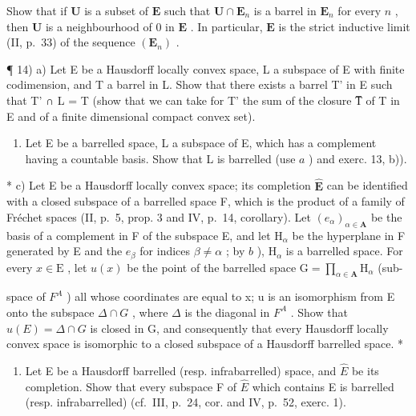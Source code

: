 Show that if \(\mathbf{U}\) is a subset of \(\mathbf{E}\) such that \(\mathbf{U} \cap \mathbf{E}_n\) is a barrel in \(\mathbf{E}_n\) for every \(n\) , then \(\mathbf{U}\) is a neighbourhood of 0 in \(\mathbf{E}\) . In particular, \(\mathbf{E}\) is the strict inductive limit (II, p.~33) of the sequence \((\mathbf{E}_n)\) .

¶ 14) a) Let E be a Hausdorff locally convex space, L a subspace of E with finite codimension, and T a barrel in L. Show that there exists a barrel T' in E such that T' ∩ L = T (show that we can take for T' the sum of the closure T̅ of T in E and of a finite dimensional compact convex set).

\begin{enumerate}
\def\labelenumi{\alph{enumi})}
\setcounter{enumi}{1}
\tightlist
\item
  Let E be a barrelled space, L a subspace of E, which has a complement having a countable basis. Show that L is barrelled (use \(a\) ) and exerc. 13, b)).
\end{enumerate}

* c) Let E be a Hausdorff locally convex space; its completion \(\hat{\mathbf{E}}\) can be identified with a closed subspace of a barrelled space F, which is the product of a family of Fréchet spaces (II, p.~5, prop. 3 and IV, p.~14, corollary). Let \((e_{\alpha})_{\alpha \in \mathbf{A}}\) be the basis of a complement in F of the subspace E, and let \(\mathrm{H}_{\alpha}\) be the hyperplane in F generated by E and the \(e_{\beta}\) for indices \(\beta \neq \alpha\) ; by \(b\) ), \(\mathrm{H}_{\alpha}\) is a barrelled space. For every \(x \in \mathrm{E}\) , let \(u(x)\) be the point of the barrelled space \(\mathrm{G} = \prod_{\alpha \in \mathbf{A}} \mathrm{H}_{\alpha}\) (sub-

space of \(F^{A}\) ) all whose coordinates are equal to x; u is an isomorphism from E onto the subspace \(\Delta \cap G\) , where \(\Delta\) is the diagonal in \(F^{A}\) . Show that \(u(E) = \Delta \cap G\) is closed in G, and consequently that every Hausdorff locally convex space is isomorphic to a closed subspace of a Hausdorff barrelled space. *

\begin{enumerate}
\def\labelenumi{\arabic{enumi})}
\setcounter{enumi}{14}
\tightlist
\item
  Let E be a Hausdorff barrelled (resp. infrabarrelled) space, and \(\hat{E}\) be its completion. Show that every subspace F of \(\hat{E}\) which contains E is barrelled (resp. infrabarrelled) (cf.~III, p.~24, cor. and IV, p.~52, exerc. 1).
\end{enumerate}


